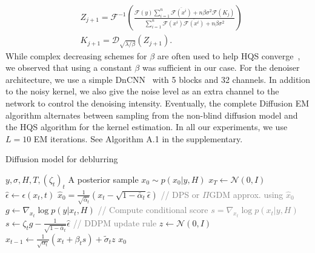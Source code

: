 \documentclass[10pt,twocolumn,letterpaper]{article}
\newcommand{\mycomment}[1]{\textcolor{gray}{// #1}}
\begin{document}
\begin{align}
    \label{equ:m_step_fin_1}
    & Z_{j+1} = \mathcal{F}^{-1}\left(\frac{\mathcal{F}(y)\sum_{i=1}^n{\overline{\mathcal{F}(x^i)} +  n \beta \sigma^2 \mathcal{F}(K_j)}}{\sum_{i=1}^n{\mathcal{F}(x^i)\overline{\mathcal{F}(x^i)}+n \beta \sigma^2 }}\right)  \\
    \label{equ:m_step_fin_2}
    & K_{j+1} = \mathcal{D}_{\sqrt{\lambda/\beta}}(Z_{j+1}).
\end{align}
%
While complex decreasing schemes for $\beta$ are often used to help HQS converge~\cite{zhang2021dpir}, we observed that using a constant $\beta$ was sufficient in our case. 
%
For the denoiser architecture, we use a simple DnCNN~\cite{zhang_beyond_2017} with 5 blocks and 32 channels. In addition to the noisy kernel, we also give the noise level as an extra channel to the network to control the denoising intensity. 
%
Eventually, the complete Diffusion EM algorithm alternates between sampling from the non-blind diffusion model and the HQS algorithm for the kernel estimation. In all our experiments, we use $L=10$ EM iterations. See Algorithm A.1 in the supplementary.
\setlength{\textfloatsep}{5pt}
%
\begin{algorithm}[t] \small
    \caption{Diffusion model for deblurring}\label{alg:diff_inv_pbm}
    \begin{algorithmic}
        \Require $y, \sigma, H, T, (\zeta_t)_t$
        \Ensure A posterior sample $x_{0} \sim p(x_{0}|y,H)$
        \State $x_T \gets \mathcal{N}(0,I)$
            \State $\widehat{\epsilon} \gets \epsilon(x_t, t)$
            \State $\widehat{x}_0 = \frac{1}{\sqrt{\bar{\alpha}_t}}(x_t - \sqrt{1-\bar{\alpha}_t}\widehat{\epsilon})$
            \State \mycomment{DPS or $\Pi$GDM approx. using $\hat{x}_0$}
            \State $g \gets \nabla_{x_t} \log p(y|x_t, H) $ 
            \State \mycomment{Compute conditional score $s=\nabla_{x_t}\log p(x_t|y,H)$}
            \State $s \gets \zeta_{t} g - \frac{1}{\sqrt{1-\bar\alpha_t}}\hat{\epsilon}$ 
            \State \mycomment{DDPM update rule}
            \State $ z \gets \mathcal{N}(0,I)$
            \State ${x}_{t-1} \gets \frac{1}{\sqrt{\alpha_t}}\left( x_t + \beta_t s\right) + \tilde\sigma_t z$
        \EndFor
        \State \Return $x_0$
    \end{algorithmic}
\end{algorithm}
%
%
\end{document}
